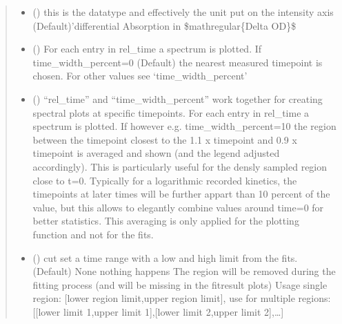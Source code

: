 \documentclass[letterpaper,10pt,english]{sphinxmanual}
\begin{document}
\begin{fulllineitems}
\begin{quote}
\begin{description}
\begin{itemize}
\item {} 
 () \textendash{} this is the datatype and effectively the unit put on the intensity axis
(Default)’differential Absorption in \$mathregular\{Delta OD\}\$

\item {} 
 (\sphinxstyleliteralemphasis{\sphinxupquote{ (}}\sphinxstyleliteralemphasis{\sphinxupquote{)}}\sphinxstyleliteralemphasis{\sphinxupquote{, }}) \textendash{} For each entry in rel\_time a spectrum is plotted. If time\_width\_percent=0 (Default) the
nearest measured timepoint is chosen. For other values see ‘time\_width\_percent’

\item {} 
 () \textendash{} “rel\_time” and “time\_width\_percent” work together for creating spectral plots at
specific timepoints. For each entry in rel\_time a spectrum is plotted.
If however e.g. time\_width\_percent=10 the region between the timepoint closest
to the  1.1 x timepoint and 0.9 x timepoint is averaged and shown
(and the legend adjusted accordingly). This is particularly useful for the densly
sampled region close to t=0. Typically for a logarithmic recorded kinetics, the
timepoints at later times will be further appart than 10 percent of the value,
but this allows to elegantly combine values around time=0 for better statistics.
This averaging is only applied for the plotting function and not for the fits.

\item {} 
 (\sphinxstyleliteralemphasis{\sphinxupquote{ (}}\sphinxstyleliteralemphasis{\sphinxupquote{)}}\sphinxstyleliteralemphasis{\sphinxupquote{, }}) \textendash{} cut set a time range with a low and high limit from the fits. (Default) None nothing happens
The region will be removed during the fitting process (and will be missing in the fit\sphinxhyphen{}result
plots)
Usage single region: {[}lower region limit,upper region limit{]},
use for multiple regions:{[}{[}lower limit 1,upper limit 1{]},{[}lower limit 2,upper limit 2{]},…{]}


\end{itemize}
\end{description}
\end{quote}
\end{fulllineitems}
\end{document}
